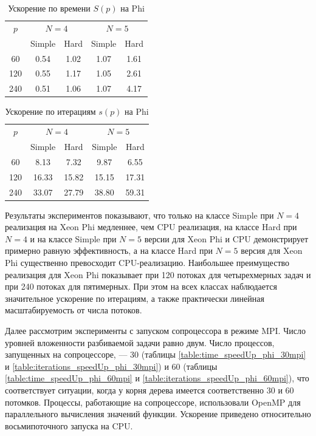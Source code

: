 \documentclass[a4paper]{article}
\begin{document}
\begin{table}
    \centering
    \begin{tabular}{|c|c|c|c|c|}
    \hline
    \(p\) & \multicolumn{2}{|c|}{\(N=4\)} & \multicolumn{2}{|c|}{\(N=5\)}\\ \cline{2-5}
    & Simple & Hard & Simple & Hard \\ \hline
	60 & 0.54 & 1.02 & 1.07 & 1.61\\ \hline
	120 & 0.55 & 1.17 & 1.05 & 2.61\\ \hline
	240 & 0.51 & 1.06 & 1.07 & 4.17\\ \hline
    \end{tabular}
    \caption{Ускорение по времени \(S(p)\) на Phi}
    \label{table:time_speedUp_phi}
\end{table}
\begin{table}
    \centering
    \begin{tabular}{|c|c|c|c|c|}
    \hline
    \(p\) & \multicolumn{2}{|c|}{\(N=4\)} & \multicolumn{2}{|c|}{\(N=5\)}\\ \cline{2-5}
    & Simple & Hard & Simple & Hard \\ \hline
	60 & 8.13 & 7.32 & 9.87 & 6.55 \\ \hline
	120 & 16.33 & 15.82 & 15.15 & 17.31 \\ \hline
	240 & 33.07 & 27.79 & 38.80 & 59.31 \\ \hline
    \end{tabular}
    \caption{Ускорение по итерациям \(s(p)\) на Phi}
    \label{table:iterations_speedUp_phi}
\end{table}
\par
Результаты экспериментов показывают, что только на классе Simple при \(N=4\) реализация на Xeon Phi медленнее, чем CPU реализация, на классе Hard при \(N=4\) и на классе Simple при \(N=5\) версии для Xeon Phi и CPU демонстрирует примерно равную эффективность, а на классе Hard при \(N=5\) версия для Xeon Phi существенно превосходит CPU-реализацию. Наибольшее преимущество реализация для Xeon Phi показывает при 120 потоках для четырехмерных задач и при 240 потоках для пятимерных. При этом на всех классах наблюдается значительное ускорение по итерациям, а также практически линейная масштабируемость от числа потоков.
\par
Далее рассмотрим эксперименты с запуском сопроцессора в режиме MPI. Число уровней вложенности разбиваемой задачи равно двум. Число процессов, запущенных на сопроцессоре, –-- 30 (таблицы \ref{table:time_speedUp_phi_30mpi} и \ref{table:iterations_speedUp_phi_30mpi}) и 60 (таблицы \ref{table:time_speedUp_phi_60mpi} и \ref{table:iterations_speedUp_phi_60mpi}), что соответствует ситуации, когда у корня дерева имеется соответственно 30 и 60 потомков. Процессы, работающие на сопроцессоре, использовали OpenMP для параллельного вычисления значений функции. Ускорение приведено относительно восьмипоточного запуска на CPU.
\end{document}
